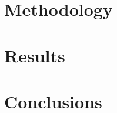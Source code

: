 \documentclass[printmode]{mgr}
\begin{document}

\chapter{Methodology}
\chapter{Results}
\chapter{Conclusions}



\listoffigures
\listoftables
\end{document}
